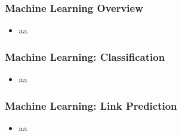\begin{frame}[fragile]\frametitle{Machine Learning Overview}

 
\begin{itemize}
\item aa
\end{itemize}


\end{frame}

\begin{frame}[fragile]\frametitle{Machine Learning: Classification}

 
\begin{itemize}
\item aa
\end{itemize}


\end{frame}

\begin{frame}[fragile]\frametitle{Machine Learning: Link Prediction}

 
\begin{itemize}
\item aa
\end{itemize}


\end{frame}